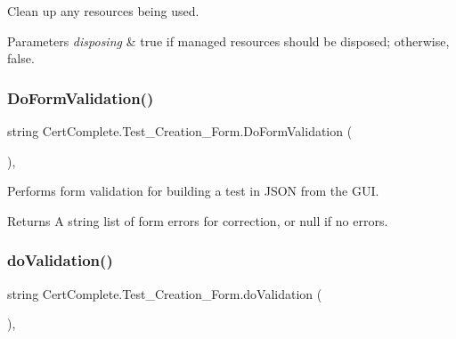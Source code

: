 Clean up any resources being used. 


\begin{DoxyParams}{Parameters}
{\em disposing} & true if managed resources should be disposed; otherwise, false.\\
\hline
\end{DoxyParams}
\mbox{\label{class_cert_complete_1_1_test___creation___form_ac92300bde2570f1e14cfefc94718f540}} 
\subsubsection{\texorpdfstring{Do\+Form\+Validation()}{DoFormValidation()}}
{\footnotesize\ttfamily string Cert\+Complete.\+Test\+\_\+\+Creation\+\_\+\+Form.\+Do\+Form\+Validation (\begin{DoxyParamCaption}{ }\end{DoxyParamCaption})\hspace{0.3cm}{\ttfamily [inline]}, {\ttfamily [private]}}



Performs form validation for building a test in J\+S\+ON from the G\+UI. 

\begin{DoxyReturn}{Returns}
A string list of form errors for correction, or null if no errors.
\end{DoxyReturn}
\mbox{\label{class_cert_complete_1_1_test___creation___form_ad6f5b44aba85d63f8a8e6c86425c2000}} 
\subsubsection{\texorpdfstring{do\+Validation()}{doValidation()}}
{\footnotesize\ttfamily string Cert\+Complete.\+Test\+\_\+\+Creation\+\_\+\+Form.\+do\+Validation (\begin{DoxyParamCaption}{ }\end{DoxyParamCaption})\hspace{0.3cm}{\ttfamily [inline]}, {\ttfamily [private]}}



